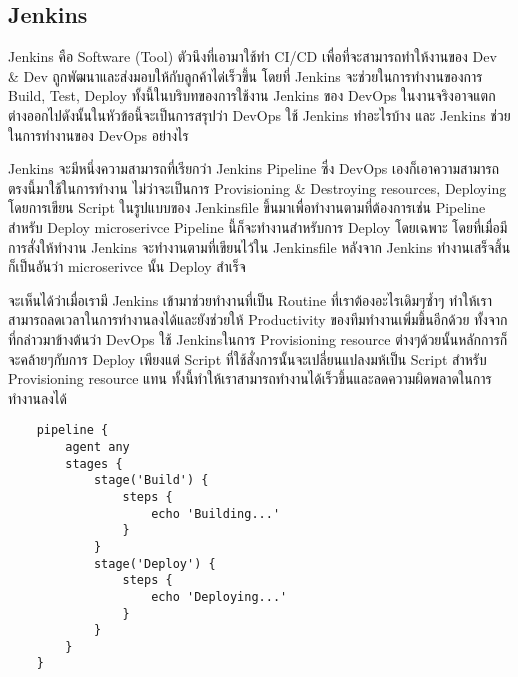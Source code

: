 \subsection{Jenkins}
Jenkins คือ Software (Tool) ตัวนึงที่เอามาใช้ทำ CI/CD \cite{cicd} เพื่อที่จะสามารถทำให้งานของ Dev \& Dev
ถูกพัฒนาและส่งมอบให้กับลูกค้าได่เร็วขึ้น โดยที่ Jenkins จะช่วยในการทำงานของการ Build, Test, Deploy
ทั้งนี้ในบริบทของการใช้งาน Jenkins ของ DevOps ในงานจริงอาจแตกต่างออกไปดังนั้นในหัวข้อนี้จะเป็นการสรุปว่า
DevOps ใช้ Jenkins ทำอะไรบ้าง และ Jenkins ช่วยในการทำงานของ DevOps อย่างไร

Jenkins จะมีหนึ่งความสามารถที่เรียกว่า Jenkins Pipeline ซึ่ง DevOps เองก็เอาความสามารถตรงนี้มาใช้ในการทำงาน
ไม่ว่าจะเป็นการ Provisioning \& Destroying resources, Deploying โดยการเขียน Script ในรูปแบบของ Jenkinsfile
ขึ้นมาเพื่อทำงานตามที่ต้องการเช่น Pipeline สำหรับ Deploy microserivce Pipeline นี้ก็จะทำงานสำหรับการ Deploy โดยเฉพาะ
โดยที่เมื่อมีการสั่งให้ทำงาน Jenkins จะทำงานตามที่เขียนไว้ใน Jenkinsfile หลังจาก Jenkins ทำงานเสร็จสิ้นก็เป็นอันว่า microserivce นั้น Deploy สำเร็จ

จะเห็นได้ว่าเมื่อเรามี Jenkins เข้ามาช่วยทำงานที่เป็น Routine ที่เราต้องอะไรเดิมๆซ้ำๆ ทำให้เราสามารถลดเวลาในการทำงานลงได้และยังช่วยให้
Productivity ของทีมทำงานเพิ่มขึ้นอีกด้วย ทั้งจากที่กล่าวมาข้างต้นว่า DevOps ใช้ Jenkinsในการ Provisioning resource ต่างๆด้วยนั้นหลักการก็จะคล้ายๆกับการ Deploy
เพียงแต่ Script ที่ใช้สั่งการนั้นจะเปลี่ยนแปลงมห้เป็น Script สำหรับ Provisioning resource แทน ทั้งนี้ทำให้เราสามารถทำงานได้เร็วขึ้นและลดความผิดพลาดในการทำงานลงได้

\begin{verbatim}
    pipeline {
        agent any
        stages {
            stage('Build') {
                steps {
                    echo 'Building...'
                }
            }
            stage('Deploy') {
                steps {
                    echo 'Deploying...'
                }
            }
        }
    }
\end{verbatim}

